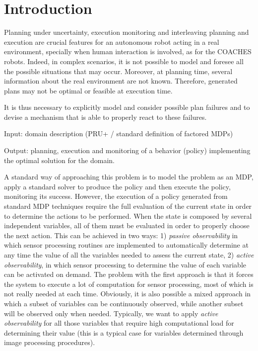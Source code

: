 \section{Introduction}



Planning under uncertainty, execution monitoring and interleaving planning and execution are crucial features for an autonomous robot acting in a real environment, specially when human interaction is involved, 
as for the COACHES robots. Indeed, in complex scenarios, it is not possible to model and foresee all the possible situations that may occur. Moreover, at planning time, several information about the real environment are not known. Therefore, generated plans may not be optimal or feasible at execution time.

It is thus necessary to explicitly model and consider possible plan failures and to devise a mechanism that is able to properly react to these failures.




Input: domain description  (PRU+ / standard definition of factored MDPs)

Output: planning, execution and monitoring of a behavior (policy) implementing the optimal solution for the domain.




A standard way of approaching this problem is to model the problem as an MDP, apply a standard solver to produce the policy and then execute the policy, monitoring its success.
However, the execution of a policy generated from standard MDP techniques require the full evaluation of the current state in order to determine the actions to be performed. When the state is composed by several independent variables, all of them must be evaluated in order to properly choose the next action.
This can be achieved in two ways: 1) \emph{passive observability} in which sensor processing routines are implemented to automatically determine at any time the value of all the variables needed to assess the current state, 2) \emph{active observability}, in which sensor processing to determine the value of each variable can be activated on demand.
The problem with the first approach is that it forces the system to execute a lot of computation for sensor processing, most of which is not really needed at each time.
Obviously, it is also possible a mixed approach in which a subset of variables can be continuously observed, while another subset will be observed only when needed. Typically, we want to apply \emph{active observability} for all those variables that require high computational load for determining their value (this is a typical case for variables determined through image processing procedures).

